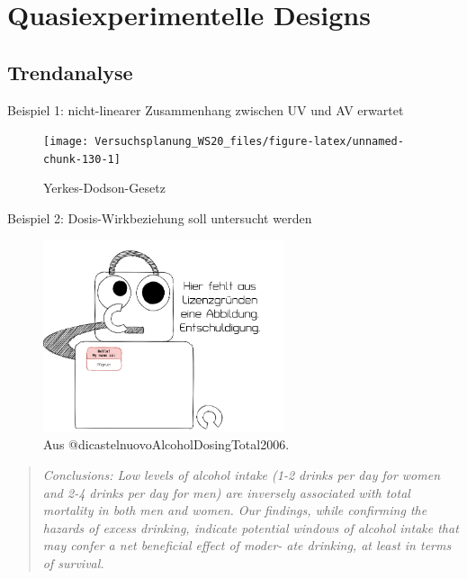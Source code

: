 \documentclass[
]{book}
\begin{document}
\hypertarget{quasiexperimentelle-designs}{%
\section{Quasiexperimentelle Designs}\label{quasiexperimentelle-designs}}

\hypertarget{trendanalyse}{%
\subsection{Trendanalyse}\label{trendanalyse}}

Beispiel 1: nicht-linearer Zusammenhang zwischen UV und AV erwartet

\begin{figure}

{\centering \texttt{[image: Versuchsplanung\_WS20\_files/figure-latex/unnamed-chunk-130-1]} 

}

\caption{Yerkes-Dodson-Gesetz}\label{fig:unnamed-chunk-130}
\end{figure}

Beispiel 2: Dosis-Wirkbeziehung soll untersucht werden

\begin{figure}

{\centering \includegraphics[width=200pt]{imgs/copyright} 

}

\caption{Aus @dicastelnuovoAlcoholDosingTotal2006.}\label{fig:unnamed-chunk-131}
\end{figure}

\begin{quote}
\emph{Conclusions: Low levels of alcohol intake (1-2 drinks
per day for women and 2-4 drinks per day for men) are
inversely associated with total mortality in both men and
women. Our findings, while confirming the hazards of
excess drinking, indicate potential windows of alcohol
intake that may confer a net beneficial effect of moder-
ate drinking, at least in terms of survival.} \citep{dicastelnuovoAlcoholDosingTotal2006}
\end{quote}
\end{document}
